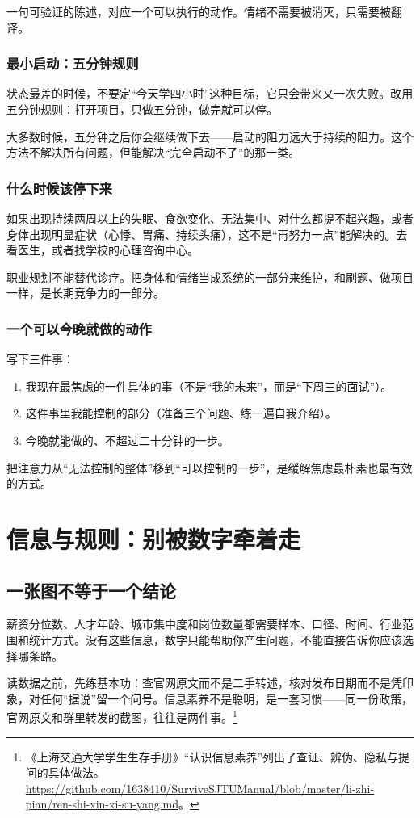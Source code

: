 \documentclass[UTF8,zihao=5,openany]{ctexbook}
\begin{document}
一句可验证的陈述，对应一个可以执行的动作。情绪不需要被消灭，只需要被翻译。

\subsection{最小启动：五分钟规则}
状态最差的时候，不要定“今天学四小时”这种目标，它只会带来又一次失败。改用五分钟规则：打开项目，只做五分钟，做完就可以停。

大多数时候，五分钟之后你会继续做下去——启动的阻力远大于持续的阻力。这个方法不解决所有问题，但能解决“完全启动不了”的那一类。

\subsection{什么时候该停下来}
如果出现持续两周以上的失眠、食欲变化、无法集中、对什么都提不起兴趣，或者身体出现明显症状（心悸、胃痛、持续头痛），这不是“再努力一点”能解决的。去看医生，或者找学校的心理咨询中心。

职业规划不能替代诊疗。把身体和情绪当成系统的一部分来维护，和刷题、做项目一样，是长期竞争力的一部分。

\subsection{一个可以今晚就做的动作}
写下三件事：
\begin{enumerate}
\item 我现在最焦虑的一件具体的事（不是“我的未来”，而是“下周三的面试”）。
\item 这件事里我能控制的部分（准备三个问题、练一遍自我介绍）。
\item 今晚就能做的、不超过二十分钟的一步。
\end{enumerate}

把注意力从“无法控制的整体”移到“可以控制的一步”，是缓解焦虑最朴素也最有效的方式。


\chapter{信息与规则：别被数字牵着走}
\section{一张图不等于一个结论}
薪资分位数、人才年龄、城市集中度和岗位数量都需要样本、口径、时间、行业范围和统计方式。没有这些信息，数字只能帮助你产生问题，不能直接告诉你应该选择哪条路。

读数据之前，先练基本功：查官网原文而不是二手转述，核对发布日期而不是凭印象，对任何“据说”留一个问号。信息素养不是聪明，是一套习惯——同一份政策，官网原文和群里转发的截图，往往是两件事。\footnote{《上海交通大学学生生存手册》“认识信息素养”列出了查证、辨伪、隐私与提问的具体做法。\url{https://github.com/1638410/SurviveSJTUManual/blob/master/li-zhi-pian/ren-shi-xin-xi-su-yang.md}。}
\end{document}
